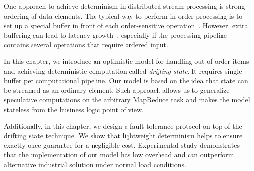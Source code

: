One approach to achieve determinism in distributed stream processing is strong ordering of data elements. The typical way to perform in-order processing is to set up a special buffer in front of each order-sensitive operation~\cite{Li:2008:OPN:1453856.1453890}. However, extra buffering can lead to latency growth~\cite{Zacheilas:2017:MDS:3093742.3093921}, especially if the processing pipeline contains several operations that require ordered input. 

In this chapter, we introduce an optimistic model for handling out-of-order items and achieving deterministic computation called {\em drifting state}. It requires single buffer per computational pipeline. Our model is based on the idea that state can be streamed as an ordinary element. Such approach allows us to generalize speculative computations on the arbitrary MapReduce task and makes the model stateless from the business logic point of view.

Additionally, in this chapter, we design a fault tolerance protocol on top of the drifting state technique. We show that lightweight determinism helps to ensure exactly-once guarantee for a negligible cost. Experimental study demonstrates that the implementation of our model has low overhead and can outperform alternative industrial solution under normal load conditions.

